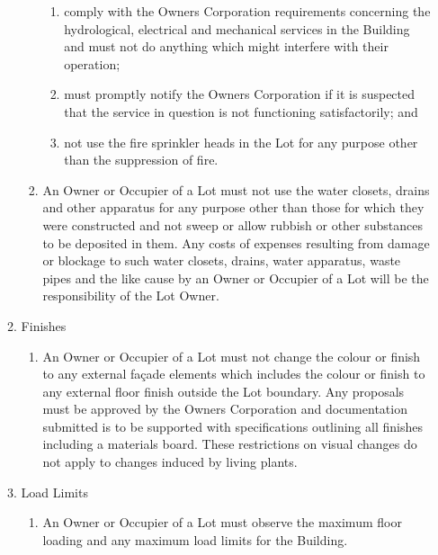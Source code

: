 \documentclass{article}
\begin{document}
\begin{enumerate}[label=\arabic*.]
\begin{enumerate}[label=\arabic{enumi}.\arabic*.]
\begin{enumerate}[label=(\arabic*)]
\begin{enumerate}[label=(\alph*)]
\item  comply with the Owners Corporation requirements concerning the hydrological, electrical and mechanical services in the Building and must not do anything which might interfere with their operation;

\item  must promptly notify the Owners Corporation if it is suspected that the service in question is not functioning satisfactorily; and

\item  not use the fire sprinkler heads in the Lot for any purpose other than the suppression of fire.

\end{enumerate}

\item  An Owner or Occupier of a Lot must not use the water closets, drains and other apparatus for any purpose other than those for which they were constructed and not sweep or allow rubbish or other substances to be deposited in them. Any costs of expenses resulting from damage or blockage to such water closets, drains, water apparatus, waste pipes and the like cause by an Owner or Occupier of a Lot will be the responsibility of the Lot Owner.

\end{enumerate}

\item  Finishes

\begin{enumerate}[label=(\arabic*)]

\item  An Owner or Occupier of a Lot must not change the colour or finish to any external façade elements which includes the colour or finish to any external floor finish outside the Lot boundary. Any proposals must be approved by the Owners Corporation and documentation submitted is to be supported with specifications outlining all finishes including a materials board. These restrictions on visual changes do not apply to changes induced by living plants.

\end{enumerate}

\item  Load Limits

\begin{enumerate}[label=(\arabic*)]

\item  An Owner or Occupier of a Lot must observe the maximum floor loading and any maximum load limits for the Building.
\newpage




\end{enumerate}
\end{enumerate}
\end{enumerate}
\end{document}
